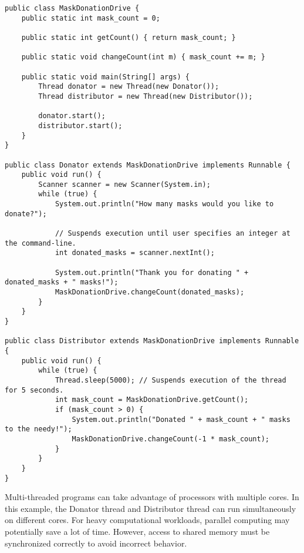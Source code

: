 \begin{solution}
\begin{lstlisting}
public class MaskDonationDrive {
    public static int mask_count = 0;

    public static int getCount() { return mask_count; }

    public static void changeCount(int m) { mask_count += m; }

    public static void main(String[] args) {
        Thread donator = new Thread(new Donator());
        Thread distributor = new Thread(new Distributor());

        donator.start();
        distributor.start();
    }
}

public class Donator extends MaskDonationDrive implements Runnable {
    public void run() {
        Scanner scanner = new Scanner(System.in);
        while (true) {
            System.out.println("How many masks would you like to donate?");
            
            // Suspends execution until user specifies an integer at the command-line.
            int donated_masks = scanner.nextInt();
            
            System.out.println("Thank you for donating " + donated_masks + " masks!");
            MaskDonationDrive.changeCount(donated_masks);
        }
    }
}

public class Distributor extends MaskDonationDrive implements Runnable {
    public void run() {
        while (true) {
            Thread.sleep(5000); // Suspends execution of the thread for 5 seconds.
            int mask_count = MaskDonationDrive.getCount();
            if (mask_count > 0) {
                System.out.println("Donated " + mask_count + " masks to the needy!");
                MaskDonationDrive.changeCount(-1 * mask_count);
            }
        }
    }
}
\end{lstlisting}
Multi-threaded programs can take advantage of processors with multiple cores. In this example, the Donator thread and Distributor thread can run simultaneously on different cores. For heavy computational workloads, parallel computing may potentially save a lot of time. However, access to shared memory must be synchronized correctly to avoid incorrect behavior.
\end{solution}